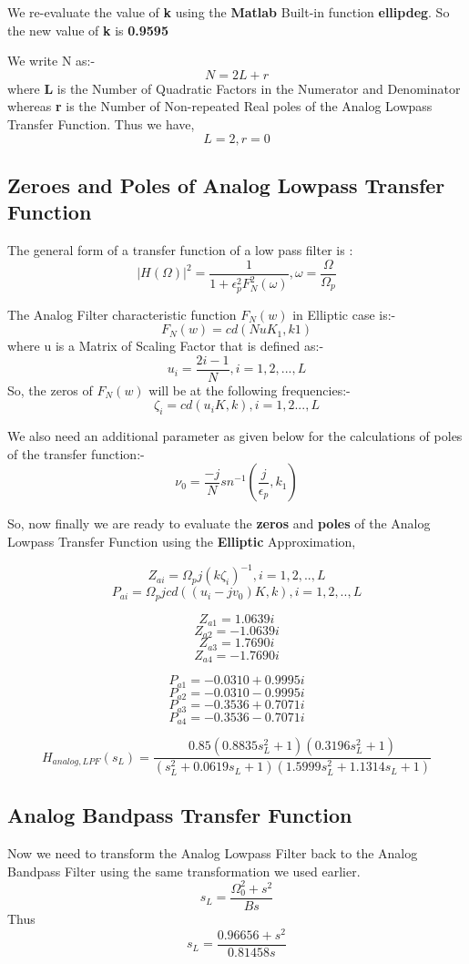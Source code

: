 \documentclass[12pt]{article}
\begin{document}
We re-evaluate the value of \textbf{k} using the \textbf{Matlab} Built-in function \textbf{ellipdeg}. So the new value of \textbf{k} is \textbf{0.9595}


We write N as:-
\[N = 2L + r\]
where \textbf{L} is the Number of Quadratic Factors in the Numerator and Denominator whereas \textbf{r} is the Number of Non-repeated Real poles of the Analog Lowpass Transfer Function.
Thus we have,
\[L = 2, r = 0\]

\subsection{Zeroes and Poles of Analog Lowpass Transfer Function}
 The general form of a transfer function of a low pass filter is :
\[|H(\Omega)|^{2} = \frac{1}{1 + \epsilon _{p}^{2}F_{N}^{2}(\omega)}, \omega = \frac{\Omega}{\Omega_{p}}\]

The Analog Filter characteristic function $F_{N}(w)$ in Elliptic case is:-
\[F_{N}(w) = cd(NuK_{1}, k1)\] where u is a Matrix of Scaling Factor that is defined as:-
\[u_{i} = \frac{2i - 1}{N}, i = 1, 2,..., L\]
So, the zeros of $F_{N}(w)$ will be at the following frequencies:-
\[\zeta_{i} = cd(u_{i}K,k),  i = 1,2...,L\]

We also need an additional parameter as given below for the calculations of poles of the transfer function:-
\[\nu_{0} = \frac{-j}{N}sn^{-1}(\frac{j}{\epsilon_{p}},k_{1})\]

So, now finally we are ready to evaluate the \textbf{zeros} and \textbf{poles} of the Analog Lowpass Transfer Function using the \textbf{Elliptic} Approximation,

\[Z_{ai} = \Omega_{p}j(k\zeta_{i})^{-1}, i = 1,2,..,L\]
\[P_{ai} = \Omega_{p}j cd((u_{i} - jv_{0})K,k), i = 1,2,..,L\]

\[Z_{a1} = 1.0639i\]
\[Z_{a2} = -1.0639i\]
\[Z_{a3} = 1.7690i\]
\[Z_{a4} = -1.7690i\]

\[P_{a1} = -0.0310 + 0.9995i\]
\[P_{a2} = -0.0310 - 0.9995i\]
\[P_{a3} = -0.3536 + 0.7071i\]
\[P_{a4} = -0.3536 - 0.7071i\]


\[H_{analog,LPF}(s_{L}) = \frac{0.85(0.8835s_{L}^{2} + 1)(0.3196s_{L}^{2} + 1)}{(s_{L}^{2} + 0.0619s_{L} + 1)(1.5999s_{L}^{2} + 1.1314s_{L} + 1)}\]

\subsection{Analog Bandpass Transfer Function}

Now we need to transform the Analog Lowpass Filter back to the Analog Bandpass Filter using the same transformation we used earlier.
\[s_{L} = \frac{\Omega_{0}^2 + s^2}{Bs}\]
Thus
\[s_{L} = \frac{0.96656 + s^2}{0.81458s}\]
\end{document}
